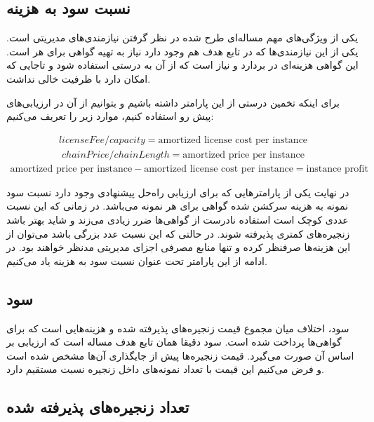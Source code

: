 \subsection{نسبت سود به هزینه}

یکی از ویژگی‌های مهم مساله‌ای طرح شده در نظر گرفتن نیازمندی‌های مدیریتی است. یکی از این نیازمندی‌ها که در تابع هدف هم
وجود دارد نیاز به تهیه گواهی برای هر  است.
این گواهی هزینه‌ای در بردارد و نیاز است که از آن به درستی استفاده شود
و تاجایی که امکان دارد  با ظرفیت خالی نداشت.

برای اینکه تخمین درستی از این پارامتر داشته باشیم و بتوانیم از آن در ارزیابی‌های پیش رو استفاده کنیم، موارد زیر را تعریف می‌کنیم:
    

\begin{latin}
    \begin{align}
      licenseFee / capacity = \text{amortized license cost per instance}
    \end{align}
    \begin{align}
      chainPrice / chainLength = \text{amortized price per instance}
    \end{align}
    \begin{align}
      \text{amortized price per instance} - \text{amortized license cost per instance} = \text{instance profit} 
    \end{align}
\end{latin}

در نهایت یکی از پارامترهایی که برای ارزیابی راه‌حل پیشنهادی وجود دارد
نسبت سود نمونه به هزینه سرکشن شده گواهی برای هر نمونه می‌باشد.
در زمانی که این نسبت عددی کوچک است استفاده نادرست از گواهی‌ها ضرر زیادی می‌زند و شاید بهتر باشد زنجیره‌های کمتری پذیرفته شوند.
در حالتی که این نسبت عدد بزرگی باشد می‌توان از این هزینه‌ها صرفنظر کرده و تنها منابع مصرفی اجزای مدیریتی مدنظر خواهند بود.
در ادامه از این پارامتر تحت عنوان نسبت سود به هزینه یاد می‌کنیم.

\subsection{سود}

سود، اختلاف میان مجموع قیمت زنجیره‌های پذیرفته شده و هزینه‌هایی است که برای گواهی‌ها پرداخت شده است. سود دقیقا همان تابع هدف مساله است که ارزیابی بر اساس آن صورت می‌گیرد. قیمت زنجیره‌ها پیش از جایگذاری آن‌ها مشخص شده است و فرض می‌کنیم این قیمت با تعداد نمونه‌های داخل زنجیره نسبت مستقیم دارد.

\subsection{تعداد زنجیره‌های پذیرفته شده}

